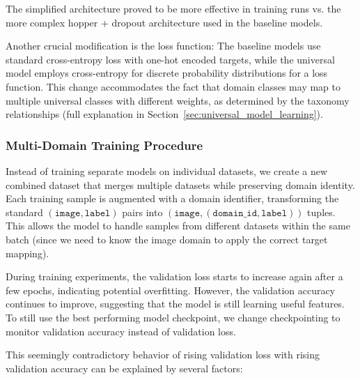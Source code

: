 The simplified architecture proved to be more effective in training runs vs. the more complex hopper + dropout architecture used in the baseline models.

Another crucial modification is the loss function:
The baseline models use standard cross-entropy loss with one-hot encoded targets,
while the universal model employs cross-entropy for discrete probability distributions for a loss function.
This change accommodates the fact that domain classes may map to multiple universal classes with different weights,
as determined by the taxonomy relationships
(full explanation in Section~\ref{sec:universal_model_learning}).

\subsubsection{Multi-Domain Training Procedure}

Instead of training separate models on individual datasets,
we create a new combined dataset that merges multiple datasets while preserving domain identity.
Each training sample is augmented with a domain identifier,
transforming the standard $(\texttt{image}, \texttt{label})$ pairs into $(\texttt{image}, (\texttt{domain\_id}, \texttt{label}))$ tuples.
This allows the model to handle samples from different datasets within the same batch
(since we need to know the image domain to apply the correct target mapping).

During training experiments, the validation loss starts to increase again after a few epochs, indicating potential overfitting.
However, the validation accuracy continues to improve, suggesting that the model is still learning useful features.
To still use the best performing model checkpoint, we change checkpointing to monitor validation accuracy instead of validation loss.

This seemingly contradictory behavior of rising validation loss with rising validation accuracy can be explained by several factors:

